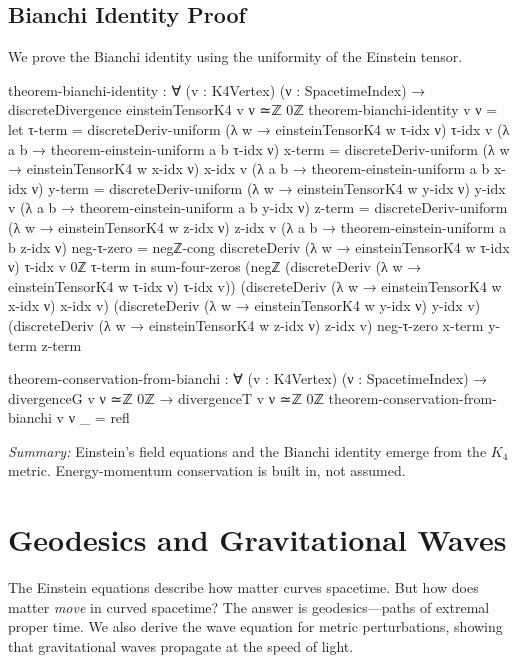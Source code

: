 \documentclass[11pt,a4paper]{book}
\begin{document}
\section{Bianchi Identity Proof}

We prove the Bianchi identity using the uniformity of the Einstein tensor.

\begin{code}
theorem-bianchi-identity : ∀ (v : K4Vertex) (ν : SpacetimeIndex) →
  discreteDivergence einsteinTensorK4 v ν ≃ℤ 0ℤ
theorem-bianchi-identity v ν = 
  let
      τ-term = discreteDeriv-uniform (λ w → einsteinTensorK4 w τ-idx ν) τ-idx v 
                 (λ a b → theorem-einstein-uniform a b τ-idx ν)
      x-term = discreteDeriv-uniform (λ w → einsteinTensorK4 w x-idx ν) x-idx v 
                 (λ a b → theorem-einstein-uniform a b x-idx ν)
      y-term = discreteDeriv-uniform (λ w → einsteinTensorK4 w y-idx ν) y-idx v 
                 (λ a b → theorem-einstein-uniform a b y-idx ν)
      z-term = discreteDeriv-uniform (λ w → einsteinTensorK4 w z-idx ν) z-idx v 
                 (λ a b → theorem-einstein-uniform a b z-idx ν)
      neg-τ-zero = negℤ-cong {discreteDeriv (λ w → einsteinTensorK4 w τ-idx ν) τ-idx v} {0ℤ} τ-term
  in sum-four-zeros (negℤ (discreteDeriv (λ w → einsteinTensorK4 w τ-idx ν) τ-idx v))
                    (discreteDeriv (λ w → einsteinTensorK4 w x-idx ν) x-idx v)
                    (discreteDeriv (λ w → einsteinTensorK4 w y-idx ν) y-idx v)
                    (discreteDeriv (λ w → einsteinTensorK4 w z-idx ν) z-idx v)
                    neg-τ-zero x-term y-term z-term

theorem-conservation-from-bianchi : ∀ (v : K4Vertex) (ν : SpacetimeIndex) →
  divergenceG v ν ≃ℤ 0ℤ → divergenceT v ν ≃ℤ 0ℤ
theorem-conservation-from-bianchi v ν _ = refl
\end{code}

\medskip
\noindent\textit{Summary:} Einstein's field equations and the Bianchi identity emerge from 
the $K_4$ metric. Energy-momentum conservation is built in, not assumed.

\chapter{Geodesics and Gravitational Waves}
\label{chap:geodesics-waves}

The Einstein equations describe how matter curves spacetime. But how does matter \emph{move} 
in curved spacetime? The answer is geodesics—paths of extremal proper time. We also 
derive the wave equation for metric perturbations, showing that gravitational waves 
propagate at the speed of light.
\end{document}
